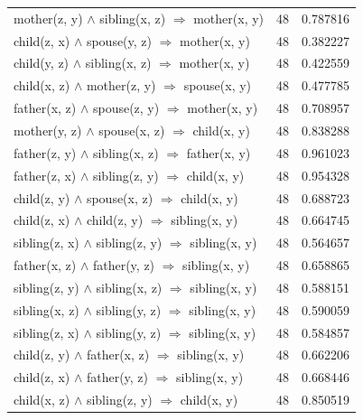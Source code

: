 \begin{longtable}{lrr}
     mother(z, y) $\wedge$ sibling(x, z)   $\Rightarrow$ mother(x, y) &           48 &        0.787816 \\
       child(z, x) $\wedge$ spouse(y, z)   $\Rightarrow$ mother(x, y) &           48 &        0.382227 \\
      child(y, z) $\wedge$ sibling(x, z)   $\Rightarrow$ mother(x, y) &           48 &        0.422559 \\
       child(x, z) $\wedge$ mother(z, y)   $\Rightarrow$ spouse(x, y) &           48 &        0.477785 \\
      father(x, z) $\wedge$ spouse(z, y)   $\Rightarrow$ mother(x, y) &           48 &        0.708957 \\
       mother(y, z) $\wedge$ spouse(x, z)   $\Rightarrow$ child(x, y) &           48 &        0.838288 \\
     father(z, y) $\wedge$ sibling(x, z)   $\Rightarrow$ father(x, y) &           48 &        0.961023 \\
      father(z, x) $\wedge$ sibling(z, y)   $\Rightarrow$ child(x, y) &           48 &        0.954328 \\
        child(z, y) $\wedge$ spouse(x, z)   $\Rightarrow$ child(x, y) &           48 &        0.688723 \\
       child(z, x) $\wedge$ child(z, y)   $\Rightarrow$ sibling(x, y) &           48 &        0.664745 \\
   sibling(z, x) $\wedge$ sibling(z, y)   $\Rightarrow$ sibling(x, y) &           48 &        0.564657 \\
     father(x, z) $\wedge$ father(y, z)   $\Rightarrow$ sibling(x, y) &           48 &        0.658865 \\
   sibling(z, y) $\wedge$ sibling(x, z)   $\Rightarrow$ sibling(x, y) &           48 &        0.588151 \\
   sibling(x, z) $\wedge$ sibling(y, z)   $\Rightarrow$ sibling(x, y) &           48 &        0.590059 \\
   sibling(z, x) $\wedge$ sibling(y, z)   $\Rightarrow$ sibling(x, y) &           48 &        0.584857 \\
      child(z, y) $\wedge$ father(x, z)   $\Rightarrow$ sibling(x, y) &           48 &        0.662206 \\
      child(z, x) $\wedge$ father(y, z)   $\Rightarrow$ sibling(x, y) &           48 &        0.668446 \\
       child(x, z) $\wedge$ sibling(z, y)   $\Rightarrow$ child(x, y) &           48 &        0.850519 \\

\end{longtable}

